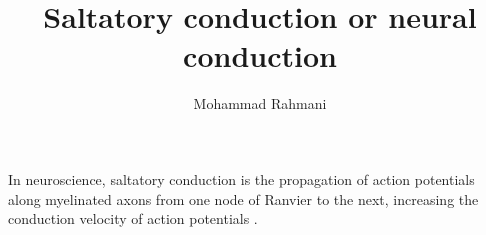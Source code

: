 \documentclass[a4paper]{article}
\title{Saltatory conduction or neural conduction}
\date{}
\author{Mohammad Rahmani}
\begin{document}
\maketitle
    In neuroscience, saltatory conduction is the propagation of action potentials along myelinated axons from one node of Ranvier to the next, increasing the conduction velocity of action potentials .
    
    
\end{document}
